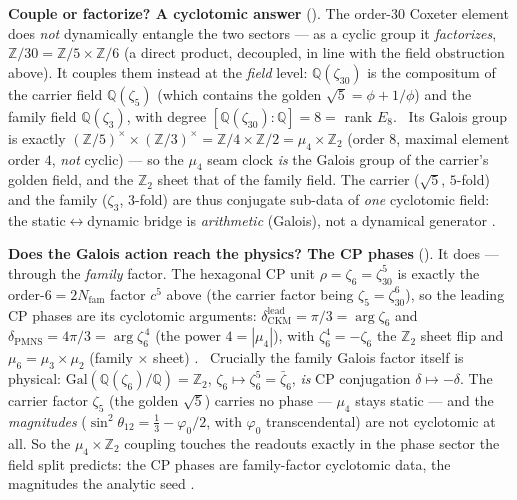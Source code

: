 \documentclass[11pt,a4paper]{article}
\newcommand{\phiz}{\varphi_0}
\newcommand{\Nfam}{N_{\mathrm{fam}}}
\newcommand{\Z}{\mathbb Z}
\begin{document}
\par\smallskip\noindent\textbf{Couple or factorize? A cyclotomic answer}
(). The order-$30$ Coxeter element does \emph{not} dynamically entangle the two
sectors --- as a cyclic group it \emph{factorizes}, $\Z/30=\Z/5\times\Z/6$ (a direct product, decoupled, in line
with the field obstruction above). It couples them instead at the \emph{field} level: $\mathbb Q(\zeta_{30})$ is the
compositum of the carrier field $\mathbb Q(\zeta_5)$ (which contains the golden $\sqrt5=\phi+1/\phi$) and the family
field $\mathbb Q(\zeta_3)$, with degree $[\mathbb Q(\zeta_{30}){:}\mathbb Q]=8=$ rank $E_8$. \mE\ Its Galois group is
exactly $(\Z/5)^\times\times(\Z/3)^\times=\Z/4\times\Z/2=\mu_4\times\Z_2$ (order $8$, maximal element order $4$,
\emph{not} cyclic) --- so the $\mu_4$ seam clock \emph{is} the Galois group of the carrier's golden field, and the
$\Z_2$ sheet that of the family field. The carrier ($\sqrt5$, $5$-fold) and the family ($\zeta_3$, $3$-fold) are
thus conjugate sub-data of \emph{one} cyclotomic field: the static$\leftrightarrow$dynamic bridge is
\emph{arithmetic} (Galois), not a dynamical generator \mC.

\par\smallskip\noindent\textbf{Does the Galois action reach the physics? The CP phases}
(). It does --- through the \emph{family} factor. The hexagonal CP unit
$\rho=\zeta_6=\zeta_{30}^5$ is exactly the order-$6=2\Nfam$ factor $c^5$ above (the carrier factor being
$\zeta_5=\zeta_{30}^6$), so the leading CP phases are its cyclotomic arguments:
$\delta_{\mathrm{CKM}}^{\mathrm{lead}}=\pi/3=\arg\zeta_6$ and $\delta_{\mathrm{PMNS}}=4\pi/3=\arg\zeta_6^{\,4}$ (the
power $4=|\mu_4|$), with $\zeta_6^4=-\zeta_6$ the $\Z_2$ sheet flip and $\mu_6=\mu_3\times\mu_2$ (family $\times$
sheet) \mC. \mE\ Crucially the family Galois factor itself is physical: $\mathrm{Gal}(\mathbb Q(\zeta_6)/\mathbb Q)
=\Z_2$, $\zeta_6\mapsto\zeta_6^5=\bar\zeta_6$, \emph{is} CP conjugation $\delta\mapsto-\delta$. The carrier factor
$\zeta_5$ (the golden $\sqrt5$) carries no phase --- $\mu_4$ stays static --- and the \emph{magnitudes}
($\sin^2\theta_{12}=\tfrac13-\phiz/2$, with $\phiz$ transcendental) are not cyclotomic at all. So the
$\mu_4\times\Z_2$ coupling touches the readouts exactly in the phase sector the field split predicts: the CP phases
are family-factor cyclotomic data, the magnitudes the analytic seed \mE.
\end{document}
